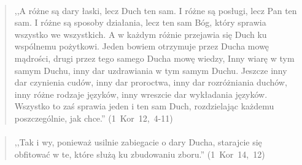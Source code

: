 \documentclass[10pt,a4paper,oneside]{article}
\begin{document}
\paragraph{}
\begin{quote}
,,A różne są dary łaski, lecz Duch ten sam. I różne są posługi, lecz Pan ten sam. I różne są sposoby działania, lecz ten sam Bóg, który sprawia wszystko we wszystkich. A w każdym różnie przejawia się Duch ku wspólnemu pożytkowi. Jeden bowiem otrzymuje przez Ducha mowę mądrości, drugi przez tego samego Ducha mowę wiedzy, Inny wiarę w tym samym Duchu, inny dar uzdrawiania w tym samym Duchu. Jeszcze inny dar czynienia cudów, inny dar proroctwa, inny dar rozróżniania duchów, inny różne rodzaje języków, inny wreszcie dar wykładania języków. Wszystko to zaś sprawia jeden i ten sam Duch, rozdzielając każdemu poszczególnie, jak chce.'' \mbox{(1 Kor 12, 4-11)}
\end{quote}
\paragraph{}
\begin{quote}
,,Tak i wy, ponieważ usilnie zabiegacie o dary Ducha, starajcie się obfitować w te, które służą ku zbudowaniu zboru.'' \mbox{(1 Kor 14, 12)}
\end{quote}
\end{document}

